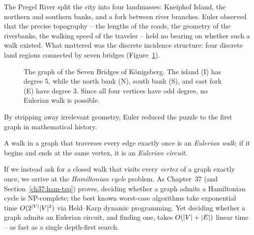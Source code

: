 The Pregel River split the city into four landmasses: Kneiphof Island, the northern and southern banks, and a fork between river branches. Euler observed that the precise topography -- the lengths of the roads, the geometry of the riverbanks, the walking speed of the traveler -- held no bearing on whether such a walk existed. What mattered was the discrete incidence structure: four discrete land regions connected by seven bridges (Figure~\ref{ch05:fig-konigsberg}).

\begin{figure}[htbp]
\centering
{}
\caption{The graph of the Seven Bridges of Königsberg. The island (I) has degree 5, while the north bank (N), south bank (S), and east fork (E) have degree 3. Since all four vertices have odd degree, no Eulerian walk is possible.}
\label{ch05:fig-konigsberg}
\end{figure}

By stripping away irrelevant geometry, Euler reduced the puzzle to the first graph in mathematical history.

A walk in a graph that traverses every edge exactly once is an \emph{Eulerian walk}; if it begins and ends at the same vertex, it is an \emph{Eulerian circuit}.

If we instead ask for a closed walk that visits every \emph{vertex} of a graph exactly once, we arrive at the \emph{Hamiltonian cycle} problem. As Chapter~37 (and Section~\ref{ch37:ham-tsp}) proves, deciding whether a graph admits a Hamiltonian cycle is NP-complete; the best known worst-case algorithms take exponential time $O(2^{\lvert V\rvert}\lvert V\rvert^2)$ via Held--Karp dynamic programming. Yet deciding whether a graph admits an Eulerian circuit, and finding one, takes $O(\lvert V\rvert+\lvert E\rvert)$ linear time -- as fast as a single depth-first search.

